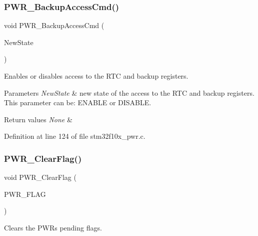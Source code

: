 \subsubsection{\texorpdfstring{P\+W\+R\+\_\+\+Backup\+Access\+Cmd()}{PWR\_BackupAccessCmd()}}
{\footnotesize\ttfamily void P\+W\+R\+\_\+\+Backup\+Access\+Cmd (\begin{DoxyParamCaption}\item[{\hyperlink{group___exported__types_gac9a7e9a35d2513ec15c3b537aaa4fba1}{Functional\+State}}]{New\+State }\end{DoxyParamCaption})}



Enables or disables access to the R\+TC and backup registers. 


\begin{DoxyParams}{Parameters}
{\em New\+State} & new state of the access to the R\+TC and backup registers. This parameter can be\+: E\+N\+A\+B\+LE or D\+I\+S\+A\+B\+LE. \\
\hline
\end{DoxyParams}

\begin{DoxyRetVals}{Return values}
{\em None} & \\
\hline
\end{DoxyRetVals}


Definition at line 124 of file stm32f10x\+\_\+pwr.\+c.

\mbox{\label{group___p_w_r___private___functions_ga01c4b2fbd16514b993324e101c3ddf7c}} 
\subsubsection{\texorpdfstring{P\+W\+R\+\_\+\+Clear\+Flag()}{PWR\_ClearFlag()}}
{\footnotesize\ttfamily void P\+W\+R\+\_\+\+Clear\+Flag (\begin{DoxyParamCaption}\item[{uint32\+\_\+t}]{P\+W\+R\+\_\+\+F\+L\+AG }\end{DoxyParamCaption})}



Clears the P\+WR\textquotesingle{}s pending flags. 


